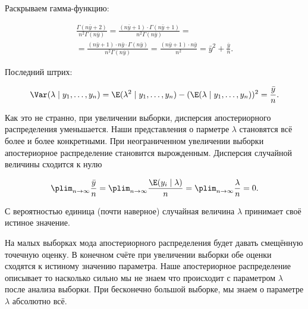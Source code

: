 \begin{problem}
\begin{sol}
Раскрываем гамма-функцию:

\begin{multline*}
 \frac{\Gamma(n \bar{y} + 2)}{n^2 \Gamma(n\bar y)} = \frac{(n \bar y + 1) \cdot \Gamma(n \bar y + 1)}{n^2 \Gamma(n \bar y)} = \\ =   \frac{(n \bar y + 1) \cdot n \bar y \cdot \Gamma(n \bar y)}{n^2 \Gamma(n \bar y)} = \frac{(n \bar y + 1) \cdot n \bar y}{n^2} = \bar{y}^2 + \frac{\bar y}{n}. 
\end{multline*}

Последний штрих:

\[ \Var(\lambda \mid y_1, \ldots, y_n) = \E(\lambda^2 \mid y_1, \ldots, y_n) - (\E(\lambda \mid y_1, \ldots, y_n))^2 = \frac{\bar y}{n}.\]

Как это не странно, при увеличении выборки, дисперсия апостериорного распределения уменьшается. Наши представления о парметре $\lambda$ становятся всё более и более конкретными. При неограниченном увеличении выборки апостериорное распределение становится вырожденным. Дисперсия случайной величины сходится к нулю

\[\plim_{n \to \infty} \frac{\bar y}{n} =  \plim_{n \to \infty} \frac{\E(y_i \mid \lambda)}{n} = \plim_{n \to \infty} \frac{\lambda}{n} = 0.\]

С вероятностью единица (почти наверное) случайная величина $\lambda$ принимает своё истиное значение.

 На малых выборках мода апостериорного распределения будет давать смещённую точечную оценку.  В конечном счёте при увеличении выборки обе оценки сходятся к истиному значению параметра. Наше апостериорное распределение описывает то насколько сильно мы не знаем что происходит с параметром $\lambda$ после анализа выборки. При бесконечно большой выборке, мы знаем о параметре $\lambda$ абсолютно всё.  
\end{sol}
\end{problem}

